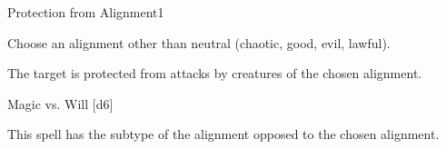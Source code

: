 \begin{spellsection}{Protection from Alignment}{1}
\begin{spellheader}
\end{spellheader}
\begin{spellcontent}
    \begin{spelltargetinginfo}
        \spellspecial Choose an alignment other than neutral (chaotic, good, evil, lawful).
    \end{spelltargetinginfo}
    \begin{spelleffects}
        \spelleffect The target is protected from attacks by creatures of the chosen alignment.
        \spelldur \durshort \dismissable
    \end{spelleffects}
\end{spellcontent}
\begin{spellsubcontent}
    \begin{spelltargetinginfo}
    \end{spelltargetinginfo}
    \begin{spelleffects}
        \begin{spellattack}{Magic vs. Will}
            \spellsuccess {}[d6]
        \end{spellattack}
    \end{spelleffects}
\end{spellsubcontent}
\begin{spellfooter}
    \spellnotes This spell has the subtype of the alignment opposed to the chosen alignment.
\end{spellfooter}

\begin{comment}
\subsubsection{Q-R}
\end{comment}
\end{spellsection}

